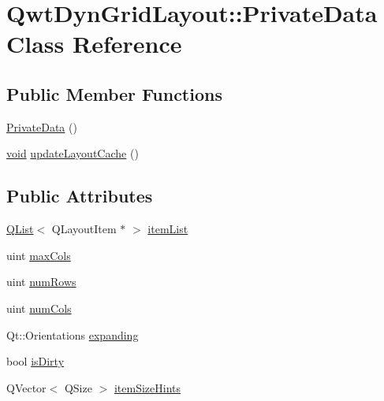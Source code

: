\hypertarget{class_qwt_dyn_grid_layout_1_1_private_data}{\section{Qwt\-Dyn\-Grid\-Layout\-:\-:Private\-Data Class Reference}
\label{class_qwt_dyn_grid_layout_1_1_private_data}
}
\subsection*{Public Member Functions}
\begin{DoxyCompactItemize}
\item 
\hyperlink{class_qwt_dyn_grid_layout_1_1_private_data_a511530c8481691b09a77e751379b09c5}{Private\-Data} ()
\item 
\hyperlink{group___u_a_v_objects_plugin_ga444cf2ff3f0ecbe028adce838d373f5c}{void} \hyperlink{class_qwt_dyn_grid_layout_1_1_private_data_a00f981840a8d942797cd1fc7b9b0f11b}{update\-Layout\-Cache} ()
\end{DoxyCompactItemize}
\subsection*{Public Attributes}
\begin{DoxyCompactItemize}
\item 
\hyperlink{class_q_list}{Q\-List}$<$ Q\-Layout\-Item $\ast$ $>$ \hyperlink{class_qwt_dyn_grid_layout_1_1_private_data_a2db2d5137324df86633368e30480ea9f}{item\-List}
\item 
uint \hyperlink{class_qwt_dyn_grid_layout_1_1_private_data_a7c8835b9a956abc986d126e782d8010f}{max\-Cols}
\item 
uint \hyperlink{class_qwt_dyn_grid_layout_1_1_private_data_a394b43e33ea0af77df5b2acc9acae2d7}{num\-Rows}
\item 
uint \hyperlink{class_qwt_dyn_grid_layout_1_1_private_data_a018d57fd3e0995fdbec3782f68817e4c}{num\-Cols}
\item 
Qt\-::\-Orientations \hyperlink{class_qwt_dyn_grid_layout_1_1_private_data_a6dad3a2a6a8c5f6f7d5646ea91ea8f29}{expanding}
\item 
bool \hyperlink{class_qwt_dyn_grid_layout_1_1_private_data_a3ac83e194b4c54ae90e4d93b5e8bf061}{is\-Dirty}
\item 
Q\-Vector$<$ Q\-Size $>$ \hyperlink{class_qwt_dyn_grid_layout_1_1_private_data_a40a22ad097c8a0698439fbe272b32439}{item\-Size\-Hints}
\end{DoxyCompactItemize}


